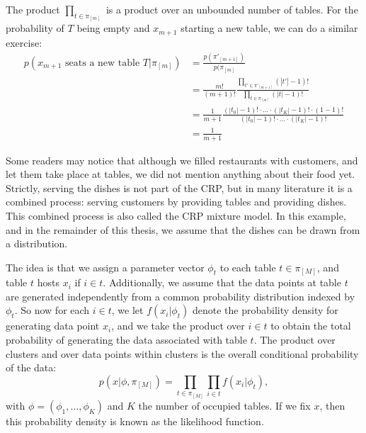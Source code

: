 The product $\prod_{t\in\pi_{[m]}}$ is a product over an unbounded number of tables. For the probability of $T$ being empty and $x_{m+1}$ starting a new table, we can do a similar exercise:
\begin{equation}
\begin{split}
	p(x_{m+1}\text{ seats a new table }T|\pi_{[m]}) &= \frac{p(\pi'_{[m+1]})}{p(\pi_{[m]}} \\
    &= \frac{m!}{(m+1)!}\frac{\prod_{t'\in\pi'_{[m+1]}}(|t'|-1)!}{\prod_{t\in\pi_{[m]}}(|t|-1)!} \\
    &= \frac{1}{m+1}\frac{(|t_0|-1)! \cdot\ldots\cdot (|t_K|-1)! \cdot (1-1)!}{(|t_0|-1)! \cdot\ldots\cdot (|t_K|-1)!} \\
	&= \frac{1}{m+1}
\end{split}
\end{equation}

Some readers may notice that although we filled restaurants with customers, and let them take place at tables, we did not mention anything about their food yet. Strictly, serving the dishes is not part of the CRP, but in many literature it is a combined process: serving customers by providing tables and providing dishes. This combined process is also called the CRP mixture model. In this example, and in the remainder of this thesis, we assume that the dishes can be drawn from a distribution.

The idea is that we assign a parameter vector $\phi_t$ to each table $t\in\pi_{[M]}$, and table $t$ hosts $x_i$ if $i\in t$. Additionally, we assume that the data points at table $t$ are generated independently from a common probability distribution indexed by $\phi_t$. So now for each $i\in t$, we let $f(x_i|\phi_t)$ denote the probability density for generating data point $x_i$, and we take the product over $i\in t$ to obtain the total probability of generating the data associated with table $t$. The product over clusters and over data points within clusters is the overall conditional probability of the data:
\begin{equation}
	p(x|\phi,\pi_{[M]}) = \prod_{t\in\pi_{[M]}}\prod_{i\in t} f(x_i|\phi_t),
\end{equation}
with $\phi=(\phi_1,\ldots,\phi_K)$ and $K$ the number of occupied tables. If we fix $x$, then this probability density is known as the likelihood function.

